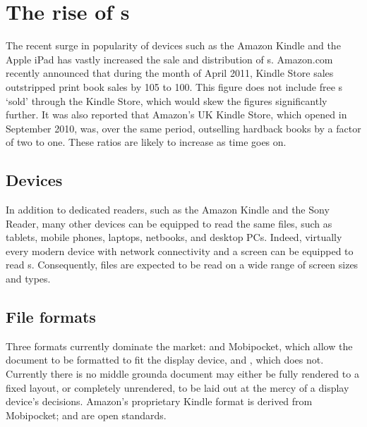 \cleardoublepage
\chapter{The rise of \ebook{}s} \label{ch:intro} %



The recent surge in popularity of devices such as the Amazon Kindle and the Apple iPad has vastly
increased the sale and distribution of \ebook{}s. Amazon.com recently announced\cite{Amazon.com2011}
that during the month of April 2011, Kindle Store sales outstripped print book sales by 105 to 100.
This figure does not include free \ebook{}s `sold' through the Kindle Store, which would skew the
figures significantly further. It was also reported that Amazon's UK Kindle Store, which opened in
September 2010, was, over the same period, outselling hardback books by a factor of two to one.
These ratios are likely to increase as time goes on.

\section{Devices}
In addition to dedicated \ebook{} readers, such as the Amazon Kindle and the Sony Reader, many other
devices can be equipped to read the same \ebook{} files, such as tablets, mobile phones, laptops,
netbooks, and desktop PCs. Indeed, virtually every modern device with network connectivity and a
screen can be equipped to read \ebook{}s. Consequently, \ebook{} files are expected to be read on a
wide range of screen sizes and types.


\section{File formats}
Three formats currently dominate the \ebook{} market: \epub{} and Mobipocket, which allow the
document to be formatted to fit the display device, and \pdf{}, which does not. Currently there is
no middle ground\ed a document may either be fully rendered to a fixed layout, or completely
unrendered, to be laid out at the mercy of a display device's decisions. Amazon's proprietary Kindle
format is derived from Mobipocket; \pdf{} and \epub{} are open standards.

